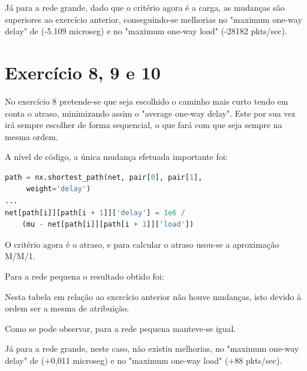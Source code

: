 \documentclass[pdftex,12pt,a4paper]{report}
\begin{document}
Já para a rede grande, dado que o critério agora é a carga, as mudanças são superiores ao exercício anterior, conseguindo-se melhorias no "maximum one-way delay" de (-5.109 microseg)   e no "maximum one-way load" (-28182 pkts/sec).  






\section{Exercício 8, 9 e 10}

No exercício 8 pretende-se que seja escolhido o caminho mais curto tendo em conta o atraso, minimizando assim o "average one-way delay". Este por sua vez irá sempre escolher de forma sequencial, o que fará com que seja sempre na mesma ordem.

A nível de código, a única mudança efetuada importante foi:
\begin{lstlisting}[language=python]
path = nx.shortest_path(net, pair[0], pair[1],
	 weight='delay')
...
net[path[i]][path[i + 1]]['delay'] = 1e6 / 
	(mu - net[path[i]][path[i + 1]]['load'])
\end{lstlisting}

O critério agora é o atraso, e para calcular o atraso usou-se a aproximação M/M/1.

Para a rede pequena o resultado obtido foi:



Nesta tabela em relação ao exercício anterior não houve mudanças, isto devido à ordem ser a mesma de atribuição.

\newpage





Como se pode observar, para a rede pequena manteve-se igual.

Já para a rede grande, neste caso, não existiu melhorias, no "maximum one-way delay" de (+0,011 microseg)   e no "maximum one-way load" (+88 pkts/sec).  



\end{document}

